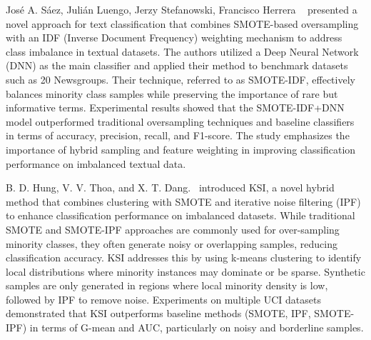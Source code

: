 \documentclass[conference]{IEEEtran}
\begin{document}
José A. Sáez, Julián Luengo, Jerzy Stefanowski, Francisco Herrera ~\cite{b2} presented a novel approach for text classification that combines SMOTE-based oversampling with an IDF (Inverse Document Frequency) weighting mechanism to address class imbalance in textual datasets. The authors utilized a Deep Neural Network (DNN) as the main classifier and applied their method to benchmark datasets such as 20 Newsgroups. Their technique, referred to as SMOTE-IDF, effectively balances minority class samples while preserving the importance of rare but informative terms. Experimental results showed that the SMOTE-IDF+DNN model outperformed traditional oversampling techniques and baseline classifiers in terms of accuracy, precision, recall, and F1-score. The study emphasizes the importance of hybrid sampling and feature weighting in improving classification performance on imbalanced textual data.


B. D. Hung, V. V. Thoa, and X. T. Dang.~\cite{b4} introduced KSI, a novel hybrid method that combines clustering with SMOTE and iterative noise filtering (IPF) to enhance classification performance on imbalanced datasets. While traditional SMOTE and SMOTE-IPF approaches are commonly used for over-sampling minority classes, they often generate noisy or overlapping samples, reducing classification accuracy. KSI addresses this by using k-means clustering to identify local distributions where minority instances may dominate or be sparse. Synthetic samples are only generated in regions where local minority density is low, followed by IPF to remove noise. Experiments on multiple UCI datasets demonstrated that KSI outperforms baseline methods (SMOTE, IPF, SMOTE-IPF) in terms of G-mean and AUC, particularly on noisy and borderline samples.
\end{document}
